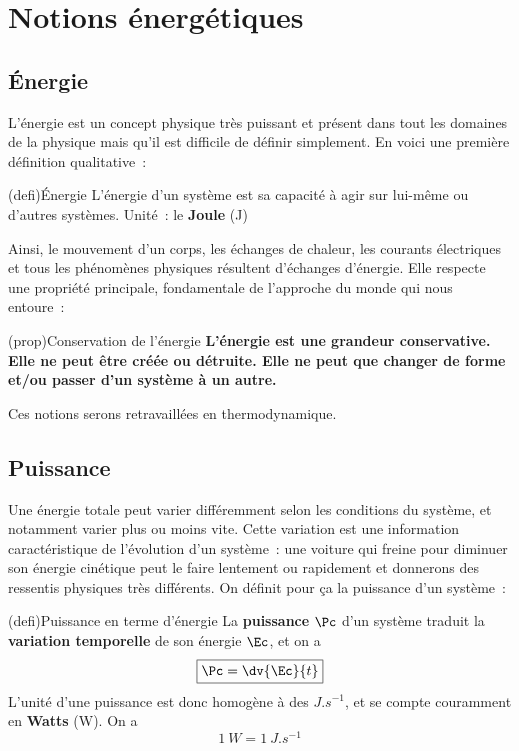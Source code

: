 \documentclass[../../main/main.tex]{subfiles}
\begin{document}
\section{Notions énergétiques}
\subsection{Énergie}
L'énergie est un concept physique très puissant et présent dans tout les
domaines de la physique mais qu'il est difficile de définir simplement. En voici
une première définition qualitative~:
\begin{tcb*}[sidebyside, righthand ratio=.3](defi){Énergie}
	L'énergie d'un système est sa capacité à agir sur lui-même ou d'autres
	systèmes.
	\tcblower
	Unité~: le \textbf{Joule} (J)
\end{tcb*}

Ainsi, le mouvement d'un corps, les échanges de chaleur, les courants
électriques et tous les phénomènes physiques résultent d'échanges d'énergie.
Elle respecte une propriété principale, fondamentale de l'approche du monde qui
nous entoure~:

\begin{tcb*}(prop){Conservation de l'énergie}
	\bfseries
	L'énergie est une grandeur conservative. Elle ne peut être créée ou
	détruite. Elle ne peut que changer de forme et/ou passer d'un système à un
	autre.
\end{tcb*}

Ces notions serons retravaillées en thermodynamique.

\vspace{-10pt}
\subsection{Puissance}

Une énergie totale peut varier différemment selon les conditions du système, et
notamment varier plus ou moins vite. Cette variation est une information
caractéristique de l'évolution d'un système~: une voiture qui freine pour
diminuer son énergie cinétique peut le faire lentement ou rapidement et
donnerons des ressentis physiques très différents. On définit pour ça la
puissance d'un système~:

\begin{tcb*}[sidebyside](defi){Puissance en terme d'énergie}
	La \textbf{puissance} $\Pc$ d'un système traduit la \textbf{variation
		temporelle} de son énergie $\Ec$, et on a
	\[\boxed{\Pc = \dv{\Ec}{t}}\]
	\tcblower
	L'unité d'une puissance est donc homogène à des $\si{J.s^{-1}}$, et se compte
	couramment en \textbf{Watts} (W). On a
	\[\boxed{\SI{1}{W} = \SI{1}{J.s^{-1}}}\]
\end{tcb*}
\end{document}
